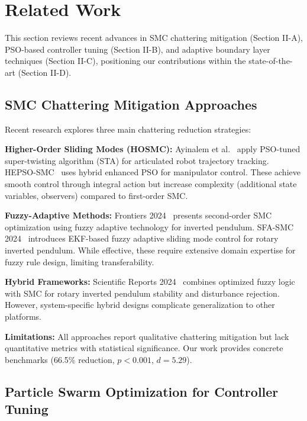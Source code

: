 \documentclass[conference]{IEEEtran}
\begin{document}
\section{Related Work}

This section reviews recent advances in SMC chattering mitigation (Section II-A), PSO-based controller tuning (Section II-B), and adaptive boundary layer techniques (Section II-C), positioning our contributions within the state-of-the-art (Section II-D).

\subsection{SMC Chattering Mitigation Approaches}

Recent research explores three main chattering reduction strategies:

\textbf{Higher-Order Sliding Modes (HOSMC):} Ayinalem et al.~\cite{ayinalem2025pso} apply PSO-tuned super-twisting algorithm (STA) for articulated robot trajectory tracking. HEPSO-SMC~\cite{hepso2025manipulator} uses hybrid enhanced PSO for manipulator control. These achieve smooth control through integral action but increase complexity (additional state variables, observers) compared to first-order SMC.

\textbf{Fuzzy-Adaptive Methods:} Frontiers 2024~\cite{frontiers2024fuzzy} presents second-order SMC optimization using fuzzy adaptive technology for inverted pendulum. SFA-SMC 2024~\cite{sfa2024rotary} introduces EKF-based fuzzy adaptive sliding mode control for rotary inverted pendulum. While effective, these require extensive domain expertise for fuzzy rule design, limiting transferability.

\textbf{Hybrid Frameworks:} Scientific Reports 2024~\cite{scirep2024fuzzy} combines optimized fuzzy logic with SMC for rotary inverted pendulum stability and disturbance rejection. However, system-specific hybrid designs complicate generalization to other platforms.

\textbf{Limitations:} All approaches report qualitative chattering mitigation but lack quantitative metrics with statistical significance. Our work provides concrete benchmarks (66.5\% reduction, $p < 0.001$, $d = 5.29$).

\subsection{Particle Swarm Optimization for Controller Tuning}
\end{document}
